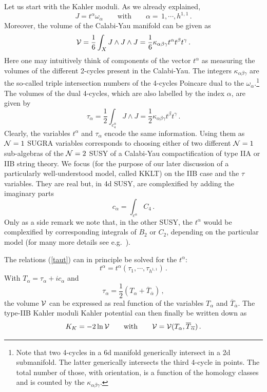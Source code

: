 \documentclass[12pt]{article}
\newcommand{\be}{\begin{equation}}
\newcommand{\ee}{\end{equation}}
\newcommand{\ol}{\overline}
\numberwithin{equation}{section}
\begin{document}
Let us start with the Kahler moduli. As we already explained,
\be
J=t^\alpha\omega_\alpha\qquad\mbox{with}\qquad \alpha=\,1,\cdots,h^{1,1}\,.
\ee
Moreover, the volume of the Calabi-Yau manifold can be given as 
\be
{\cal V}=\frac{1}{6}\int_X J\wedge J\wedge J = \frac{1}{6}\kappa_{\alpha\beta\gamma} t^\alpha t^\beta t^\gamma\,.
\ee
Here one may intuitively think of components of the vector $t^\alpha$ as measuring the volumes of the different 2-cycles present in the Calabi-Yau.  The integers $\kappa_{\alpha\beta\gamma}$ are the so-called triple intersection numbers of the 4-cycles Poincare dual to the $\omega_\alpha$.\footnote{
Note 
that two 4-cycles in a 6d manifold generically intersect in a 2d submanifold. The latter generically intersects the third 4-cycle in points. The total number of those, with orientation, is a function of the homology classes and is counted by the $\kappa_{\alpha\beta\gamma}$.
} 
The volumes of the dual 4-cycles, which are also labelled by the index $\alpha$, are given by 
\be
\tau_\alpha=\frac{1}{2}\int_{c_4^\alpha}J\wedge J=\frac{1}{2} \kappa_{\alpha\beta\gamma} t^\beta t^\gamma\,.
\label{taut}
\ee
Clearly, the variables $t^\alpha$ and $\tau_\alpha$ encode the same information. Using them as ${\cal N}=1$ SUGRA variables corresponds to choosing either of  two different ${\cal N}=1$ sub-algebras of the ${\cal N}=2$ SUSY of a Calabi-Yau compactification of type IIA or IIB string theory. We focus (for the purpose of our later discussion of a particularly well-understood model, called KKLT) on the IIB case and the $\tau$ variables. They are real but, in 4d SUSY, are complexified by adding the imaginary parts
\be
c_\alpha=\int_{c^\alpha}C_4\,.
\ee
Only as a side remark we note that, in the other SUSY, the $t^\alpha$ would be complexified by corresponding integrals of $B_2$ or $C_2$, depending on the particular model (for many more details see e.g.~\cite{Grimm:2004uq, Jockers:2004yj, Grimm:2004ua, Kerstan:2011dy}).

The relations (\ref{taut}) can in principle be solved for the $t^\alpha$:
\be
t^\alpha=t^\alpha(\tau_1,\cdots,\tau_{h^{1,1}})\,.
\ee
With $T_\alpha=\tau_\alpha+ic_\alpha$ and 
\be
\tau_\alpha=\frac{1}{2}(T_\alpha+\ol{T}_{\ol{\alpha}})\,,
\ee
the volume ${\cal V}$ can be expressed as real function of the variables $T_\alpha$ and $\ol{T}_{\ol{\alpha}}$. The type-IIB Kahler moduli Kahler potential can then finally be written down as
\be
K_K=-2\ln{\cal V}\qquad\mbox{with}\qquad {\cal V}={\cal V}(T_\alpha,\ol{T}_{\ol{\alpha}})\,.
\ee
\end{document}
